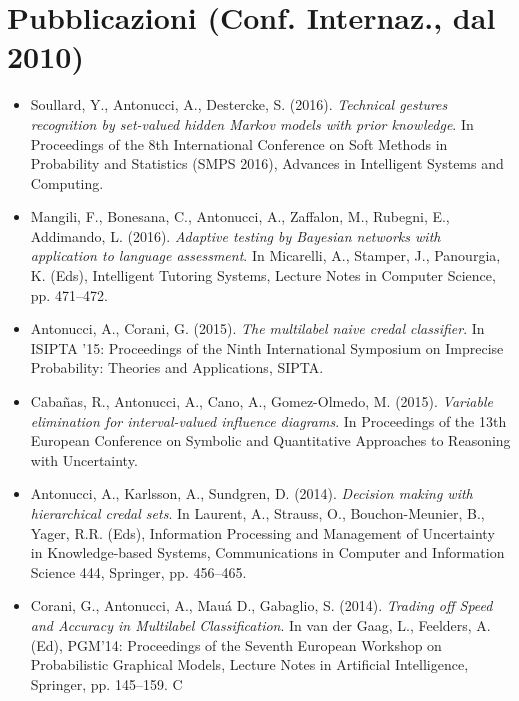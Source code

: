 \documentclass[12pt,a4paper]{moderncv}
\begin{document}
\section{Pubblicazioni (Conf. Internaz., dal 2010)}
\begin{itemize}
\item Soullard, Y., Antonucci, A., Destercke, S. (2016). \textit{Technical gestures recognition by set-valued hidden Markov models with prior knowledge}. In Proceedings of the 8th International Conference on Soft Methods in Probability and Statistics (SMPS 2016), Advances in Intelligent Systems and Computing.
\item Mangili, F., Bonesana, C., Antonucci, A., Zaffalon, M., Rubegni, E., Addimando, L. (2016). \textit{Adaptive testing by Bayesian networks with application to language assessment}. In Micarelli, A., Stamper, J., Panourgia, K. (Eds), Intelligent Tutoring Systems, Lecture Notes in Computer Science, pp. 471--472. 
\item Antonucci, A., Corani, G. (2015). \textit{The multilabel naive credal classifier}. In ISIPTA '15: Proceedings of the Ninth International Symposium on Imprecise Probability: Theories and Applications, SIPTA.
\item Caba\~nas, R., Antonucci, A., Cano, A., Gomez-Olmedo, M. (2015). \textit{Variable elimination for interval-valued influence diagrams}. In Proceedings of the 13th European Conference on Symbolic and Quantitative Approaches to Reasoning with Uncertainty.
\item Antonucci, A., Karlsson, A., Sundgren, D. (2014). \textit{Decision making with hierarchical credal sets}. In Laurent, A., Strauss, O., Bouchon-Meunier, B., Yager, R.R. (Eds), Information Processing and Management of Uncertainty in Knowledge-based Systems, Communications in Computer and Information Science 444, Springer, pp. 456--465.
\item Corani, G., Antonucci, A., Mau\'a D., Gabaglio, S. (2014). \textit{Trading off Speed and Accuracy in Multilabel Classification}. In van der Gaag, L., Feelders, A. (Ed), PGM'14: Proceedings of the Seventh European Workshop on Probabilistic Graphical Models, Lecture Notes in Artificial Intelligence, Springer, pp. 145--159.
C
\end{itemize}
\end{document}
